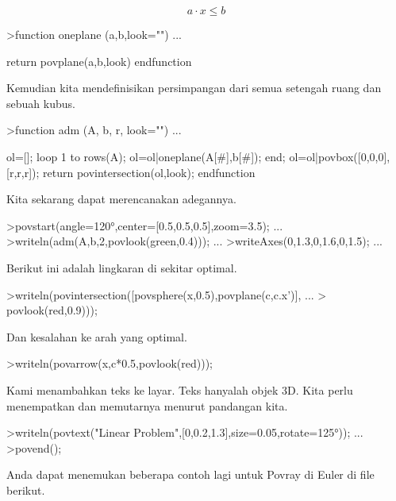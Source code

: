 \documentclass[a4paper,10pt]{article}
\begin{document}
\begin{eulernotebook}
\begin{eulercomment}
\end{eulercomment}
\begin{eulerformula}
\[
a \cdot x \le b
\]
\end{eulerformula}
\begin{eulerprompt}
>function oneplane (a,b,look="") ...
\end{eulerprompt}
\begin{eulerudf}
    return povplane(a,b,look)
  endfunction
\end{eulerudf}
\begin{eulercomment}
Kemudian kita mendefinisikan persimpangan dari semua setengah ruang
dan sebuah kubus.
\end{eulercomment}
\begin{eulerprompt}
>function adm (A, b, r, look="") ...
\end{eulerprompt}
\begin{eulerudf}
    ol=[];
    loop 1 to rows(A); ol=ol|oneplane(A[#],b[#]); end;
    ol=ol|povbox([0,0,0],[r,r,r]);
    return povintersection(ol,look);
  endfunction
\end{eulerudf}
\begin{eulercomment}
Kita sekarang dapat merencanakan adegannya.
\end{eulercomment}
\begin{eulerprompt}
>povstart(angle=120°,center=[0.5,0.5,0.5],zoom=3.5); ...
>writeln(adm(A,b,2,povlook(green,0.4))); ...
>writeAxes(0,1.3,0,1.6,0,1.5); ...
\end{eulerprompt}
\begin{eulercomment}
Berikut ini adalah lingkaran di sekitar optimal.
\end{eulercomment}
\begin{eulerprompt}
>writeln(povintersection([povsphere(x,0.5),povplane(c,c.x')], ...
>  povlook(red,0.9)));
\end{eulerprompt}
\begin{eulercomment}
Dan kesalahan ke arah yang optimal.
\end{eulercomment}
\begin{eulerprompt}
>writeln(povarrow(x,c*0.5,povlook(red)));
\end{eulerprompt}
\begin{eulercomment}
Kami menambahkan teks ke layar. Teks hanyalah objek 3D. Kita perlu
menempatkan dan memutarnya menurut pandangan kita.
\end{eulercomment}
\begin{eulerprompt}
>writeln(povtext("Linear Problem",[0,0.2,1.3],size=0.05,rotate=125°)); ...
>povend();
\end{eulerprompt}
\begin{eulercomment}
\begin{eulercomment}
\begin{eulercomment}
Anda dapat menemukan beberapa contoh lagi untuk Povray di Euler di
file berikut.


\end{eulercomment}
\end{eulercomment}
\end{eulercomment}
\end{eulernotebook}
\end{document}
